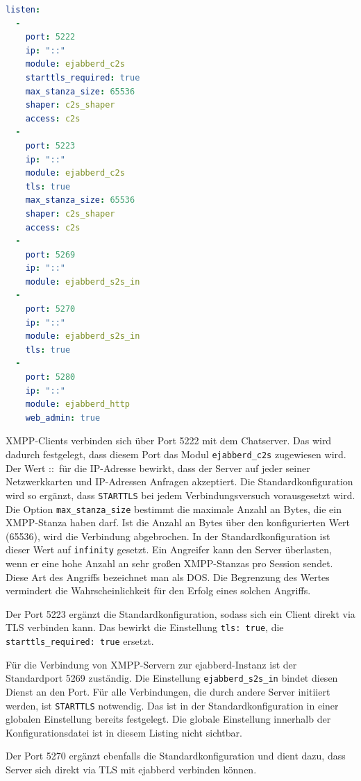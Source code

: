 \documentclass[a4paper,titlepage,halfparskip,12pt]{scrreprt}
\begin{document}
\begin{onehalfspacing}
\bigskip

\begin{lstlisting}[language=yaml, caption={Konfiguration der Ports}, label={lst:ejabberdPortsConfig}]
listen:
  -
    port: 5222
    ip: "::"
    module: ejabberd_c2s
    starttls_required: true
    max_stanza_size: 65536
    shaper: c2s_shaper
    access: c2s
  -
    port: 5223
    ip: "::"
    module: ejabberd_c2s
    tls: true
    max_stanza_size: 65536
    shaper: c2s_shaper
    access: c2s
  -
    port: 5269
    ip: "::"
    module: ejabberd_s2s_in
  -
    port: 5270
    ip: "::"
    module: ejabberd_s2s_in
    tls: true
  -
    port: 5280
    ip: "::"
    module: ejabberd_http
    web_admin: true
\end{lstlisting}

\ac{XMPP}-Clients verbinden sich über Port 5222 mit dem Chatserver. Das wird dadurch festgelegt, dass diesem Port das Modul \texttt{ejabberd\_c2s} zugewiesen wird. Der Wert \glqq ::\grqq\ für die IP-Adresse bewirkt, dass der Server auf jeder seiner Netzwerkkarten und IP-Adressen Anfragen akzeptiert. Die Standardkonfiguration wird so ergänzt, dass \texttt{STARTTLS} bei jedem Verbindungsversuch vorausgesetzt wird. Die Option \texttt{max\_stanza\_size} bestimmt die maximale Anzahl an Bytes, die ein \ac{XMPP}-Stanza haben darf. Ist die Anzahl an Bytes über den konfigurierten Wert (65536), wird die Verbindung abgebrochen. In der Standardkonfiguration ist dieser Wert auf \texttt{infinity} gesetzt. Ein Angreifer kann den Server überlasten, wenn er eine hohe Anzahl an sehr großen \ac{XMPP}-Stanzas pro Session sendet. Diese Art des Angriffs bezeichnet man als \ac{DOS}. Die Begrenzung des Wertes vermindert die Wahrscheinlichkeit für den Erfolg eines solchen Angriffs.\cite{XMPPDOS}

Der Port 5223 ergänzt die Standardkonfiguration, sodass sich ein Client direkt via \ac{TLS} verbinden kann. Das bewirkt die Einstellung \texttt{tls: true}, die \texttt{starttls\_required: true} ersetzt.

Für die Verbindung von \ac{XMPP}-Servern zur ejabberd-Instanz ist der Standardport 5269 zuständig. Die Einstellung \texttt{ejabberd\_s2s\_in} bindet diesen Dienst an den Port. Für alle Verbindungen, die durch andere Server initiiert werden, ist \texttt{STARTTLS} notwendig. Das ist in der Standardkonfiguration in einer globalen Einstellung bereits festgelegt. Die globale Einstellung innerhalb der Konfigurationsdatei ist in diesem Listing nicht sichtbar.

Der Port 5270 ergänzt ebenfalls die Standardkonfiguration und dient dazu, dass Server sich direkt via \ac{TLS} mit ejabberd verbinden können.


\end{onehalfspacing}
\end{document}
